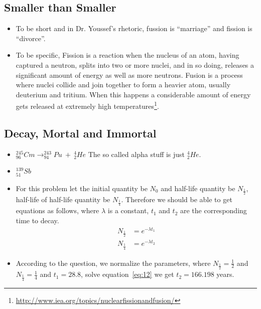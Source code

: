 \documentclass[12pt]{article}
\begin{document}
\subsection{Smaller than Smaller}
\label{sec:smaller-than-smaller}

\begin{itemize}
\item To be short and in Dr. Youssef's rhetoric, fussion is ``marriage''
  and fission is ``divorce''.
\item To be specific, Fission is a reaction when the nucleus of an
  atom, having captured a neutron, splits into two or more nuclei, and
  in so doing, releases a significant amount of energy as well as more
  neutrons.  Fusion is a process where nuclei collide and join
  together to form a heavier atom, usually deuterium and tritium. When
  this happens a considerable amount of energy gets released at
  extremely high
  temperatures\footnote{\url{http://www.iea.org/topics/nuclearfissionandfusion/}}. 
\end{itemize}

\subsection{Decay, Mortal and Immortal}
\label{sec:decay-mort-immort}

\begin{itemize}
\item $^{245}_{96}Cm\rightarrow ^{243}_{94}Pu~+~^{4}_{2}He$ The so
  called alpha stuff is just $^{4}_{2}He$.
\item $^{139}_{51}Sb$
\item For this problem let the initial quantity be $N_{0}$ and
  half-life quantity be $N_{\frac{1}{2}}$, half-life of half-life
  quantity be $N_{\frac{1}{4}}$. Therefore we should be able to get
  equations as follows, where $\lambda$ is a constant, $t_{1}$ and
  $t_{2}$ are the corresponding time to decay.
  \begin{equation}
    \label{eq:12}
    \begin{split}
      N_{\frac{1}{2}} & = e^{-\lambda t_{1}}\\[4pt]
      N_{\frac{1}{4}} & = e^{-\lambda t_{2}}
    \end{split}
  \end{equation}
\item According to the question, we normalize the parameters, where
  $N_{\frac{1}{2}}=\frac{1}{2}$ and $N_{\frac{1}{4}}=\frac{1}{4}$ and
  $t_{1}=28.8$, solve equation~\eqref{eq:12} we get $t_{2}=166.198$ years.
\end{itemize}
\end{document}
